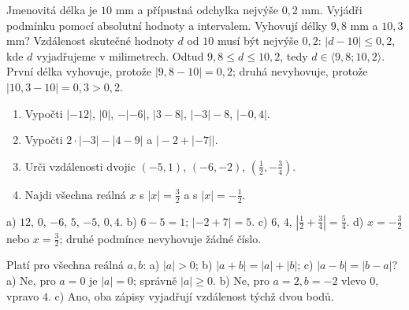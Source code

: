 \documentclass[11pt,a4paper]{article}
\begin{document}
\begin{prikladReseniBox}[title={Příklad 5},breakable=false]
Jmenovitá délka je $10$ mm a přípustná odchylka nejvýše $0{,}2$ mm.
Vyjádři podmínku pomocí absolutní hodnoty a intervalem.
Vyhovují délky $9{,}8$ mm a $10{,}3$ mm?
\tcblower
Vzdálenost skutečné hodnoty $d$ od $10$ musí být nejvýše $0{,}2$:
$|d-10|\le0{,}2$, kde $d$ vyjadřujeme v milimetrech.
Odtud $9{,}8\le d\le10{,}2$, tedy $d\in\langle9{,}8;10{,}2\rangle$.
První délka vyhovuje, protože $|9{,}8-10|=0{,}2$;
druhá nevyhovuje, protože $|10{,}3-10|=0{,}3>0{,}2$.
\end{prikladReseniBox}

\begin{zadaniReseniBox}[title={Samostatná práce 1},breakable=false]
\begin{enumerate}[label=\alph*)]
\item Vypočti $|-12|$, $|0|$, $-|-6|$, $|3-8|$, $|-3|-8$, $|-0{,}4|$.
\item Vypočti $2\cdot|-3|-|4-9|$ a $\bigl|-2+|-7|\bigr|$.
\item Urči vzdálenosti dvojic $(-5,1)$, $(-6,-2)$, $(\frac12,-\frac34)$.
\item Najdi všechna reálná $x$ s $|x|=\frac32$ a s $|x|=-\frac12$.
\end{enumerate}
\tcblower
a) $12$, $0$, $-6$, $5$, $-5$, $0{,}4$.
b) $6-5=1$; $|-2+7|=5$.
c) $6$, $4$, $|\frac12+\frac34|=\frac54$.
d) $x=-\frac32$ nebo $x=\frac32$; druhé podmínce nevyhovuje žádné číslo.
\end{zadaniReseniBox}

\begin{zadaniReseniBox}[title={Samostatná práce 2},breakable=false]
Platí pro všechna reálná $a,b$: a) $|a|>0$;
b) $|a+b|=|a|+|b|$; c) $|a-b|=|b-a|$?
\tcblower
a) Ne, pro $a=0$ je $|a|=0$; správně $|a|\ge0$.
b) Ne, pro $a=2,b=-2$ vlevo $0$, vpravo $4$.
c) Ano, oba zápisy vyjadřují vzdálenost týchž dvou bodů.
\end{zadaniReseniBox}

\end{document}
